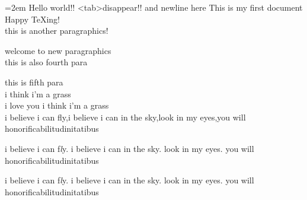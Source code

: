 \documentclass{article}
\begin{document}
  \parindent=2em
  Hello    world!!	\textless tab\textgreater disappear!!
  and newline\xspace here
  This is my first document\\
  Happy \TeX ing!\\
  this is another \qquad paragraphics!

  welcome to new paragraphics\\
  \newpage
  \indent this is also fourth para\par\addvspace{2em}
  \noindent this is\hspace{2ex} fifth para\\
  \phantom{i love you }i think i'm a grass\\
  i love you i think i'm a grass\\
  i believe i can fly,i believe i can in the sky,look in my eyes,you will honorificabilit\-udinitatibus\\
  \par
  \spaceskip=2mm
  \setlength{\parskip}{10pt}
  i believe i can f{\it l}y. i believe i can in the sky. look in my eyes. you will honorificabilitudinitatibus\par
  \xspaceskip=10mm
  i believe i can f{\it l}\/y. i believe  \vadjust{\vspace{10pt}} i can in the sky. look in my eyes. you will honorificabilit\-udinitatibus\par
\end{document}

